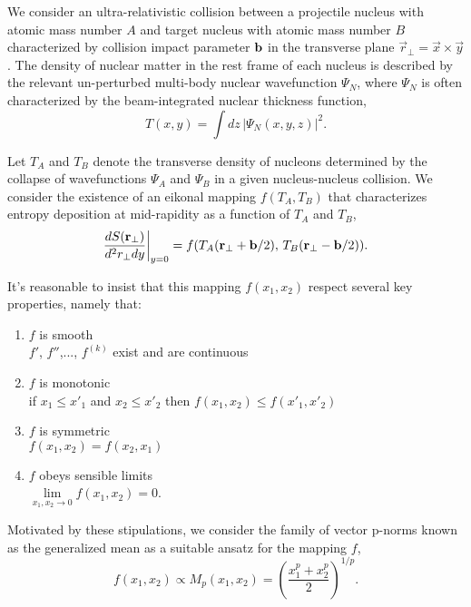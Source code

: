 \documentclass[aps,prl,reprint,amsmath,nofootinbib]{revtex4-1}
\begin{document}
We consider an ultra-relativistic collision between a projectile nucleus with atomic mass number $A$ and
target nucleus with atomic mass number $B$ characterized by collision impact parameter ${\bf b}$ in the
transverse plane $\vec{r}_\perp = \vec{x} \times \vec{y}$. The density of nuclear matter in the rest frame of
each nucleus is described by the relevant un-perturbed multi-body nuclear wavefunction $\Psi_N$, where
$\Psi_N$ is often characterized by the beam-integrated nuclear thickness function,
\begin{equation}
  T(x,y) = \int dz\, \left|\Psi_N(x,y,z) \right|^2.
\end{equation}

Let $T_A$ and $T_B$ denote the transverse density of nucleons determined by the collapse of wavefunctions
$\Psi_A$ and $\Psi_B$ in a given nucleus-nucleus collision. We consider the existence of an eikonal mapping
$f(T_A,T_B)$ that characterizes entropy deposition at mid-rapidity as a function of $T_A$ and $T_B$,
\begin{equation}
  \label{ansatz}
  \frac{dS({\bf r}_\perp)}{d^2r_\perp dy} \biggr \rvert_{y=0} =
  f(T_A({\bf r}_\perp + {\bf b}/2),\,T_B({\bf r}_\perp - {\bf b}/2)).
\end{equation}

It's reasonable to insist that this mapping $f(x_1,x_2)$ respect several key properties, namely that:
\begin{enumerate}
  \item{$f$ is smooth} \\
    $f'$, $f''$,..., $f^{(k)}$ exist and are continuous
  \item{$f$ is monotonic} \\
    if $x_1 \le x'_1$ and $x_2 \le x'_2$ then $f(x_1,x_2) \le f(x'_1,x'_2)$
  \item{$f$ is symmetric} \\
    $f(x_1,x_2) = f(x_2,x_1)$
  \item{$f$ obeys sensible limits} \\
    $\lim\limits_{x_1,x_2 \to 0} f(x_1,x_2) = 0$.
\end{enumerate}
Motivated by these stipulations, we consider the family of vector p-norms known as the generalized mean as a
suitable ansatz for the mapping $f$,
\begin{equation}
  \label{generalized mean ansatz}
  f(x_1, x_2) \propto M_p(x_1,x_2) = \left( \frac{x_1^p + x_2^p}{2} \right)^{1/p}.
\end{equation}
\end{document}
